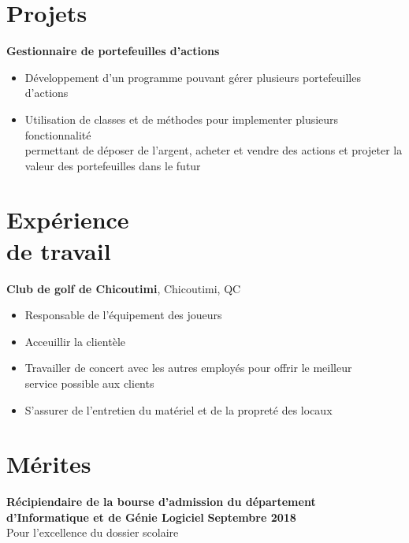 \documentclass[margin,line]{resume}
\begin{document}
\begin{resume}
    \section{\mysidestyle Projets}
    \textbf{Gestionnaire de portefeuilles d'actions} \vspace{2mm}\\\vspace{1mm}%
    \begin{itemize}[nosep]
        \item D\'{e}veloppement d'un programme pouvant g\'{e}rer plusieurs portefeuilles \\d'actions
        \item Utilisation de classes et de m\'{e}thodes pour implementer plusieurs fonctionnalit\'{e} \\permettant de d\'{e}poser de l'argent, acheter et vendre des actions et projeter la \\valeur des portefeuilles dans le futur
    \end{itemize} 
    
    \section{\mysidestyle Exp\'{e}rience\\de travail}
    \textbf{Club de golf de Chicoutimi}, Chicoutimi, QC \vspace{2mm}\\\vspace{1mm}%
    \begin{itemize}[nosep]
        \item Responsable de l'\'{e}quipement des joueurs
        \item Acceuillir la client\`{e}le
        \item Travailler de concert avec les autres employ\'{e}s pour offrir le meilleur \\ service possible aux clients
        \item S'assurer de l'entretien du mat\'{e}riel et de la propret\'{e} des locaux
    \end{itemize}


    \section{\mysidestyle M\'{e}rites} 
     \textbf{R\'{e}cipiendaire de la bourse d'admission du d\'{e}partement \\ d'Informatique et de G\'{e}nie Logiciel } 
     \hfill \textbf{Septembre 2018} \vspace{2mm}\\\vspace{1mm}%
        Pour l'excellence du dossier scolaire
        

\end{resume}
\end{document}
